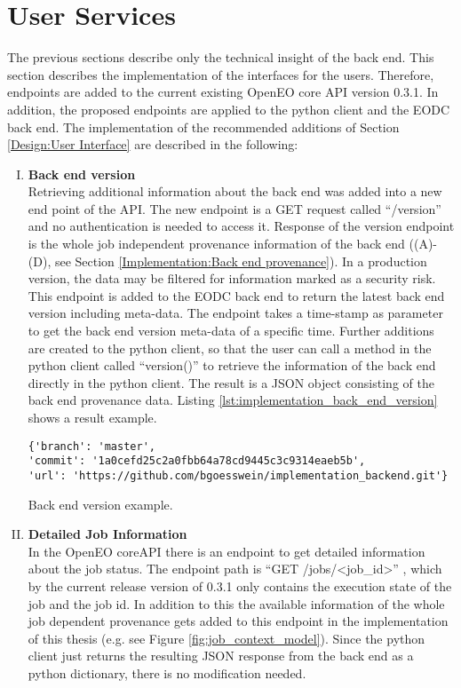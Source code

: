 \documentclass[draft,final]{vutinfth} %
\begin{document}
\section{User Services}\label{Implementation:User Interface}
The previous sections describe only the technical insight of the back end. This section describes the implementation of the interfaces for the users. Therefore, endpoints are added to the current existing OpenEO core API version 0.3.1. In addition, the proposed endpoints are applied to the python client and the EODC back end. The implementation of the recommended additions of Section \ref{Design:User Interface} are described in the following:
\begin{enumerate}[I.]
\item \textbf{Back end version} \\
	Retrieving additional information about the back end was added into a new end point of the API. The new endpoint is a GET request called “/version” and no authentication is needed to access it. Response of the version endpoint is the whole job independent provenance information of the back end ((A)-(D), see Section \ref{Implementation:Back end provenance}). In a production version, the data may be filtered for information marked as a security risk. This endpoint is added to the EODC back end to return the latest back end version including meta-data. The endpoint takes a time-stamp as parameter to get the back end version meta-data of a specific time. Further additions are created to the python client, so that the user can call a method in the python client called “version()” to retrieve the information of the back end directly in the python client. The result is a JSON object consisting of the back end provenance data. Listing \ref{lst:implementation_back_end_version} shows a result example.

\begin{listing}[ht]
	\begin{verbatim}
{'branch': 'master',
'commit': '1a0cefd25c2a0fbb64a78cd9445c3c9314eaeb5b',
'url': 'https://github.com/bgoesswein/implementation_backend.git'}
	\end{verbatim}
	\caption{Back end version example.}
	\label{lst:implementation_back_end_version}
\end{listing}

\item \textbf{Detailed Job Information} \\
	In the OpenEO coreAPI there is an endpoint to get detailed information about the job status. The endpoint path is “GET /jobs/<job\_id>” , which by the current release version of 0.3.1 only contains the execution state of the job and the job id. In addition to this the available information of the whole job dependent provenance gets added to this endpoint in the implementation of this thesis (e.g. see Figure \ref{fig:job_context_model}). Since the python client just returns the resulting JSON response from the back end as a python dictionary, there is no modification needed.


\end{enumerate}
\end{document}
